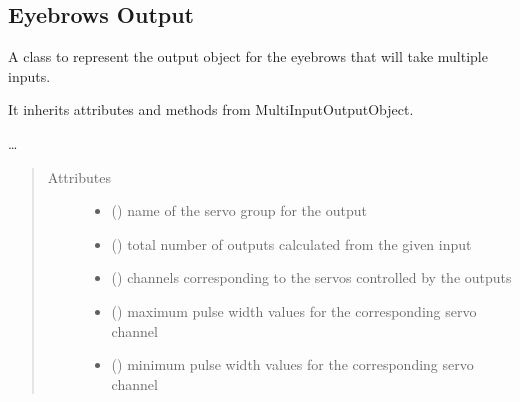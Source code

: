 \documentclass[letterpaper,10pt,english]{sphinxmanual}
\begin{document}
\subsection{Eyebrows Output}
\label{\detokenize{specific:module-EyebrowsOutput}}\label{\detokenize{specific:eyebrows-output}}

\begin{fulllineitems}
\label{\detokenize{specific:EyebrowsOutput.EyebrowsOutput}}
\sphinxAtStartPar
A class to represent the output object for the eyebrows that will 
take multiple inputs.

\sphinxAtStartPar
It inherits attributes and methods from MultiInputOutputObject.

\sphinxAtStartPar
…
\begin{quote}\begin{description}
\item[{Attributes}] \leavevmode\begin{itemize}
\item {} 
\sphinxAtStartPar
{}() \textendash{} name of the servo group for the output

\item {} 
\sphinxAtStartPar
{}() \textendash{} total number of outputs 
calculated from the given input

\item {} 
\sphinxAtStartPar
{}(\sphinxstyleemphasis{{[}int{]}}) \textendash{} channels corresponding to 
the servos controlled by the outputs

\item {} 
\sphinxAtStartPar
{}(\sphinxstyleemphasis{{[}int{]}}) \textendash{} maximum pulse width values 
for the corresponding servo channel

\item {} 
\sphinxAtStartPar
{}(\sphinxstyleemphasis{{[}int{]}}) \textendash{} minimum pulse width values 
for the corresponding servo channel


\end{itemize}
\end{description}
\end{quote}
\end{fulllineitems}
\end{document}
